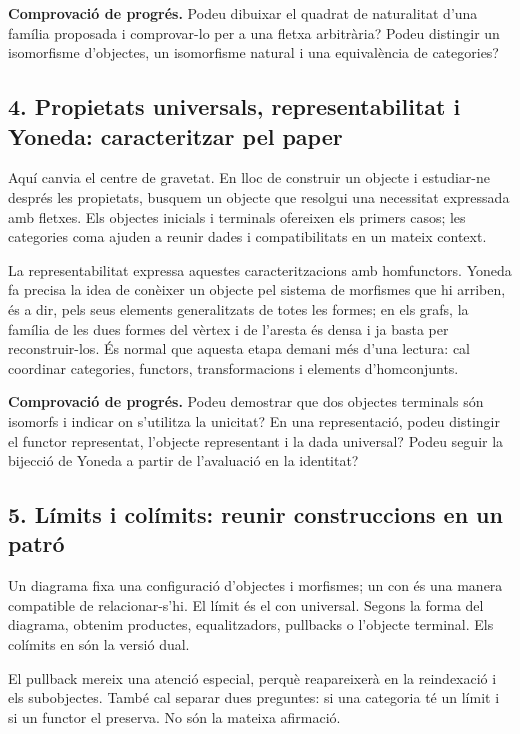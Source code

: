 \noindent\textbf{Comprovació de progrés.} Podeu dibuixar el quadrat
de naturalitat d'una família proposada i comprovar-lo per a una
fletxa arbitrària? Podeu distingir un isomorfisme d'objectes,
un isomorfisme natural i una equivalència de categories?

\subsection*{4. Propietats universals, representabilitat i Yoneda:
caracteritzar pel paper}

Aquí canvia el centre de gravetat. En lloc de construir un objecte
i estudiar-ne després les propietats, busquem un objecte que
resolgui una necessitat expressada amb fletxes. Els objectes
inicials i terminals ofereixen els primers casos; les categories
coma ajuden a reunir dades i compatibilitats en un mateix context.

La representabilitat expressa aquestes caracteritzacions amb
homfunctors. Yoneda fa precisa la idea de conèixer un objecte
pel sistema de morfismes que hi arriben, és a dir, pels seus
elements generalitzats de totes les formes; en els grafs, la
família de les dues formes del vèrtex i de l'aresta és densa i
ja basta per reconstruir-los. És normal que aquesta
etapa demani més d'una lectura: cal coordinar categories, functors,
transformacions i elements d'homconjunts.

\noindent\textbf{Comprovació de progrés.} Podeu demostrar que dos
objectes terminals són isomorfs i indicar on s'utilitza la unicitat?
En una representació, podeu distingir el functor representat,
l'objecte representant i la dada universal? Podeu seguir la
bijecció de Yoneda a partir de l'avaluació en la identitat?

\subsection*{5. Límits i colímits: reunir construccions en un patró}

Un diagrama fixa una configuració d'objectes i morfismes; un con
és una manera compatible de relacionar-s'hi. El límit és el con
universal. Segons la forma del diagrama, obtenim productes,
equalitzadors, pullbacks o l'objecte terminal. Els colímits en
són la versió dual.

El pullback mereix una atenció especial, perquè reapareixerà
en la reindexació i els subobjectes. També cal separar dues
preguntes: si una categoria té un límit i si un functor el
preserva. No són la mateixa afirmació.

